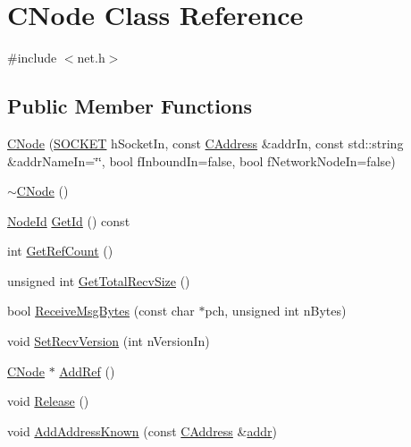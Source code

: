 \hypertarget{class_c_node}{}\section{C\+Node Class Reference}
\label{class_c_node}


{\ttfamily \#include $<$net.\+h$>$}

\subsection*{Public Member Functions}
\begin{DoxyCompactItemize}
\item 
\mbox{\hyperlink{class_c_node_abcec47da0b91ebbff6f0f123dbf2dba5}{C\+Node}} (\mbox{\hyperlink{compat_8h_a26ef1173e2f2c0d3db27eca28397d723}{S\+O\+C\+K\+ET}} h\+Socket\+In, const \mbox{\hyperlink{class_c_address}{C\+Address}} \&addr\+In, const std\+::string \&addr\+Name\+In=\char`\"{}\char`\"{}, bool f\+Inbound\+In=false, bool f\+Network\+Node\+In=false)
\item 
\mbox{\hyperlink{class_c_node_ac9b30cb93e91a48dacc58821abfc44f0}{$\sim$\+C\+Node}} ()
\item 
\mbox{\hyperlink{net_8h_a954d746a58632565552615fd0a4ee660}{Node\+Id}} \mbox{\hyperlink{class_c_node_a157903f7830c0dfbf6a93852066f0b8f}{Get\+Id}} () const
\item 
int \mbox{\hyperlink{class_c_node_a72211aaf51af2e981e6b8a1deb73c836}{Get\+Ref\+Count}} ()
\item 
unsigned int \mbox{\hyperlink{class_c_node_a2cff79a034258ba032257e993fc42e62}{Get\+Total\+Recv\+Size}} ()
\item 
bool \mbox{\hyperlink{class_c_node_a84a10eb3aec7fdddafeb354527b50b75}{Receive\+Msg\+Bytes}} (const char $\ast$pch, unsigned int n\+Bytes)
\item 
void \mbox{\hyperlink{class_c_node_a94438c6285d1635c62ccff10593780e6}{Set\+Recv\+Version}} (int n\+Version\+In)
\item 
\mbox{\hyperlink{class_c_node}{C\+Node}} $\ast$ \mbox{\hyperlink{class_c_node_afb65ed679f7bda59aab89e0f5afae292}{Add\+Ref}} ()
\item 
void \mbox{\hyperlink{class_c_node_af804bf7c7f9794e80a3b916e1befece9}{Release}} ()
\item 
void \mbox{\hyperlink{class_c_node_a1d2cecdd03c9da642d292f6a81ac6ed8}{Add\+Address\+Known}} (const \mbox{\hyperlink{class_c_address}{C\+Address}} \&\mbox{\hyperlink{class_c_node_a3993ecb1de2a2135a3cf0904346a6f88}{addr}})
\item 

\end{DoxyCompactItemize}
